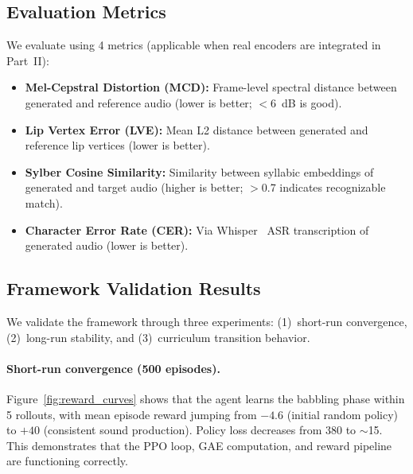 \documentclass[11pt, a4paper]{article}
\begin{document}
\subsection{Evaluation Metrics}

We evaluate using 4 metrics (applicable when real encoders are integrated in Part~II):
\begin{itemize}
    \item \textbf{Mel-Cepstral Distortion (MCD):} Frame-level spectral distance between generated and reference audio (lower is better; $<$6~dB is good).
    \item \textbf{Lip Vertex Error (LVE):} Mean L2 distance between generated and reference lip vertices (lower is better).
    \item \textbf{Sylber Cosine Similarity:} Similarity between syllabic embeddings of generated and target audio (higher is better; $>$0.7 indicates recognizable match).
    \item \textbf{Character Error Rate (CER):} Via Whisper~\cite{radford2023whisper} ASR transcription of generated audio (lower is better).
\end{itemize}

\subsection{Framework Validation Results}

We validate the framework through three experiments: (1)~short-run convergence, (2)~long-run stability, and (3)~curriculum transition behavior.

\paragraph{Short-run convergence (500 episodes).}
Figure~\ref{fig:reward_curves} shows that the agent learns the babbling phase within 5 rollouts, with mean episode reward jumping from $-4.6$ (initial random policy) to $+40$ (consistent sound production). Policy loss decreases from 380 to $\sim$15. This demonstrates that the PPO loop, GAE computation, and reward pipeline are functioning correctly.
\end{document}
